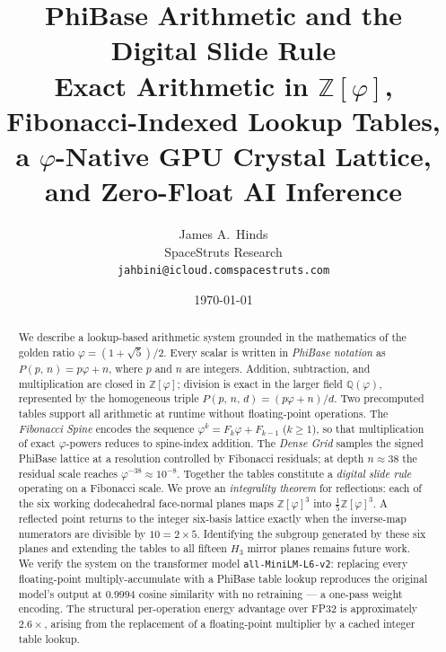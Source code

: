 \documentclass[12pt]{article}
\theoremstyle{definition}
\theoremstyle{remark}
\newcommand{\Zphi}{\mathbb{Z}[\varphi]}
\newcommand{\Qphi}{\mathbb{Q}(\varphi)}
\newcommand{\Phib}[2]{P(#1,\,#2)}
\newcommand{\Phibd}[3]{P(#1,\,#2,\,#3)}
\begin{document}
\title{%
  \textbf{PhiBase Arithmetic and the Digital Slide Rule}\\[6pt]
  \large Exact Arithmetic in $\mathbb{Z}[\varphi]$,
  Fibonacci-Indexed Lookup Tables,\\
  a $\varphi$-Native GPU Crystal Lattice,
  and Zero-Float AI Inference
}
\author{%
  James A.~Hinds\\
  SpaceStruts Research\\[4pt]
  \small\texttt{jahbini@icloud.com\quad spacestruts.com}
}
\date{\today}
\maketitle
\thispagestyle{fancy}
\begin{abstract}
We describe a lookup-based arithmetic system grounded in the mathematics
of the golden ratio $\varphi=(1+\sqrt{5})/2$.  Every scalar is written
in \emph{PhiBase notation} as $\Phib{p}{n}=p\varphi+n$, where $p$ and
$n$ are integers.  Addition, subtraction, and multiplication are closed
in $\Zphi$; division is exact in the larger field $\Qphi$, represented
by the homogeneous triple $\Phibd{p}{n}{d}=(p\varphi+n)/d$.
Two precomputed tables support all arithmetic at runtime without
floating-point operations.  The \emph{Fibonacci Spine} encodes the
sequence $\varphi^k=F_k\varphi+F_{k-1}$ ($k\geq 1$), so that
multiplication of exact $\varphi$-powers reduces to spine-index
addition.  The \emph{Dense Grid} samples the signed PhiBase lattice at
a resolution controlled by Fibonacci residuals; at depth $n\approx 38$
the residual scale reaches $\varphi^{-38}\approx 10^{-8}$.  Together
the tables constitute a \emph{digital slide rule} operating on a
Fibonacci scale.
We prove an \emph{integrality theorem} for reflections: each of the
six working dodecahedral face-normal planes maps $\Zphi^3$ into
$\tfrac{1}{5}\Zphi^3$.  A reflected point returns to the integer
six-basis lattice exactly when the inverse-map numerators are divisible
by $10=2\times5$.  Identifying the subgroup generated by these six
planes and extending the tables to all fifteen $H_3$ mirror planes
remains future work.
We verify the system on the transformer model \texttt{all-MiniLM-L6-v2}:
replacing every floating-point multiply-accumulate with a PhiBase table
lookup reproduces the original model's output at $0.9994$ cosine
similarity with no retraining --- a one-pass weight encoding.  The
structural per-operation energy advantage over FP32 is approximately
$2.6\times$, arising from the replacement of a floating-point multiplier
by a cached integer table lookup.
\end{abstract}
\tableofcontents
\newpage
\end{document}
